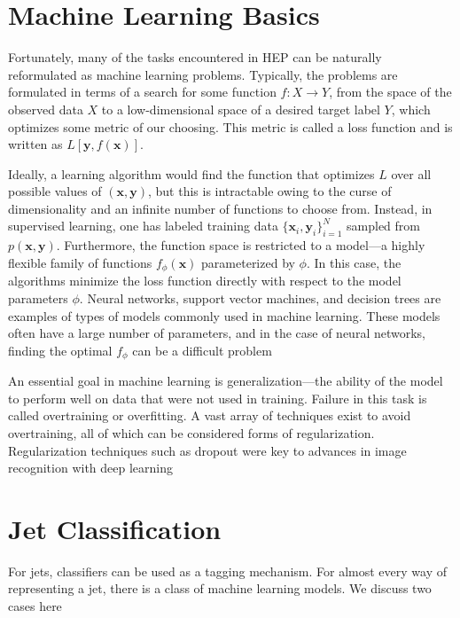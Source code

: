 \section{Machine Learning Basics}
Fortunately, many of the tasks encountered in HEP can be naturally reformulated as machine learning problems. 
%
Typically, the problems are formulated in terms of a search for some function \(f:X \to Y\), from the space of the observed data \(X\) to a low-dimensional space of a desired target label \(Y\), which optimizes some metric of our choosing. 
%
This metric is called a loss function and is written as \(L[ \mathbf{y}, f (\mathbf{x})]\).
%

Ideally, a learning algorithm would find the function that optimizes \(L\) over all possible values
of \((\mathbf{x}, \mathbf{y})\), but this is intractable owing to the curse of dimensionality and an infinite number of functions to choose from. 
%
Instead, in supervised learning, one has labeled training data \(\{\mathbf{x}_i , \mathbf{y}_i\}^N_{i=1}\) sampled from \(p(\mathbf{x} , \mathbf{y})\). 
%
Furthermore, the function space is restricted to a model—a highly flexible family of functions \(f_\phi(\mathbf{x})\) parameterized by \(\phi\). 
%
In this case, the algorithms minimize the loss function directly with respect to the model parameters \(\phi\). 
%
Neural networks, support vector machines, and decision trees are examples of types of models commonly used in machine learning. 
%
These models often have a large number of parameters, and in the case of neural networks, finding the optimal \(f_\phi\) can be a difficult problem
%

An essential goal in machine learning is generalization—the ability of the model to perform well on data that were not used in training. 
%
Failure in this task is called overtraining or overfitting. 
%
A vast array of techniques exist to avoid overtraining, all of which can be considered forms of regularization. 
%
Regularization techniques such as dropout were key to advances in image recognition with deep learning

\section{Jet Classification}
For jets, classifiers can be used as a tagging mechanism. 
%
For almost every way of representing a jet, there is a class of machine learning models.
%
We discuss two cases here
